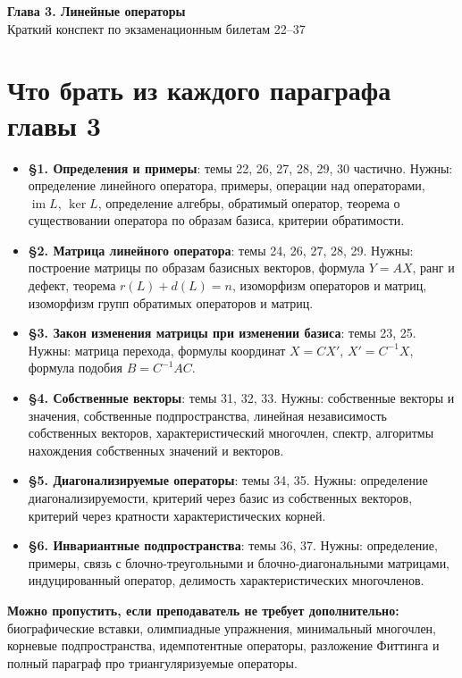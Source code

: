\documentclass[12pt,a4paper]{article}
\DeclareMathOperator{\Ker}{ker}
\DeclareMathOperator{\Image}{im}
\begin{document}
\begin{center}
    {\Large \textbf{Глава 3. Линейные операторы}}\\[4pt]
    {\large Краткий конспект по экзаменационным билетам 22--37}
\end{center}

\tableofcontents
\newpage

\section*{Что брать из каждого параграфа главы 3}

\begin{itemize}
    \item \textbf{\S 1. Определения и примеры}: темы 22, 26, 27, 28, 29, 30 частично. Нужны: определение линейного оператора, примеры, операции над операторами, $\Image L$, $\Ker L$, определение алгебры, обратимый оператор, теорема о существовании оператора по образам базиса, критерии обратимости.
    \item \textbf{\S 2. Матрица линейного оператора}: темы 24, 26, 27, 28, 29. Нужны: построение матрицы по образам базисных векторов, формула $Y=AX$, ранг и дефект, теорема $r(L)+d(L)=n$, изоморфизм операторов и матриц, изоморфизм групп обратимых операторов и матриц.
    \item \textbf{\S 3. Закон изменения матрицы при изменении базиса}: темы 23, 25. Нужны: матрица перехода, формулы координат $X=CX'$, $X'=C^{-1}X$, формула подобия $B=C^{-1}AC$.
    \item \textbf{\S 4. Собственные векторы}: темы 31, 32, 33. Нужны: собственные векторы и значения, собственные подпространства, линейная независимость собственных векторов, характеристический многочлен, спектр, алгоритмы нахождения собственных значений и векторов.
    \item \textbf{\S 5. Диагонализируемые операторы}: темы 34, 35. Нужны: определение диагонализируемости, критерий через базис из собственных векторов, критерий через кратности характеристических корней.
    \item \textbf{\S 6. Инвариантные подпространства}: темы 36, 37. Нужны: определение, примеры, связь с блочно-треугольными и блочно-диагональными матрицами, индуцированный оператор, делимость характеристических многочленов.
\end{itemize}

\textbf{Можно пропустить, если преподаватель не требует дополнительно:} биографические вставки, олимпиадные упражнения, минимальный многочлен, корневые подпространства, идемпотентные операторы, разложение Фиттинга и полный параграф про триангуляризуемые операторы.
\end{document}
